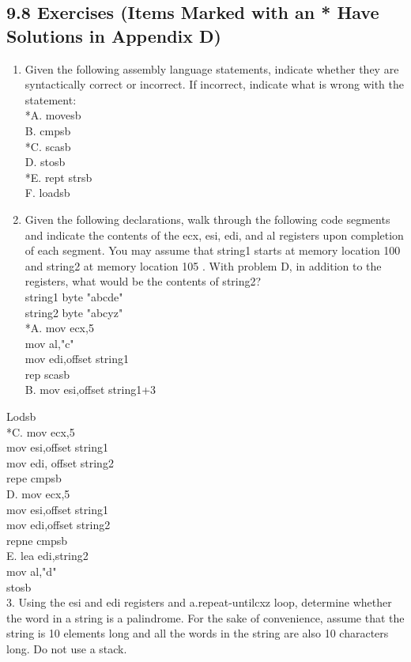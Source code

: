 \documentclass[10pt]{article}
\begin{document}
\subsection*{9.8 Exercises (Items Marked with an * Have Solutions in Appendix D)}
\begin{enumerate}
  \item Given the following assembly language statements, indicate whether they are syntactically correct or incorrect. If incorrect, indicate what is wrong with the statement:\\
*A. movesb\\
B. cmpsb\\
*C. scasb\\
D. stosb\\
*E. rept strsb\\
F. loadsb
  \item Given the following declarations, walk through the following code segments and indicate the contents of the ecx, esi, edi, and al registers upon completion of each segment. You may assume that string1 starts at memory location 100 and string2 at memory location 105 . With problem D, in addition to the registers, what would be the contents of string2?\\
string1 byte "abcde"\\
string2 byte "abcyz"\\
*A. mov ecx,5\\
mov al,"c"\\
mov edi,offset string1\\
rep scasb\\
B. mov esi,offset string1+3
\end{enumerate}

Lodsb\\
*C. mov ecx,5\\
mov esi,offset string1\\
mov edi, offset string2\\
repe cmpsb\\
D. mov ecx,5\\
mov esi,offset string1\\
mov edi,offset string2\\
repne cmpsb\\
E. lea edi,string2\\
mov al,"d"\\
stosb\\
3. Using the esi and edi registers and a.repeat-untilcxz loop, determine whether the word in a string is a palindrome. For the sake of convenience, assume that the string is 10 elements long and all the words in the string are also 10 characters long. Do not use a stack.
\end{document}
